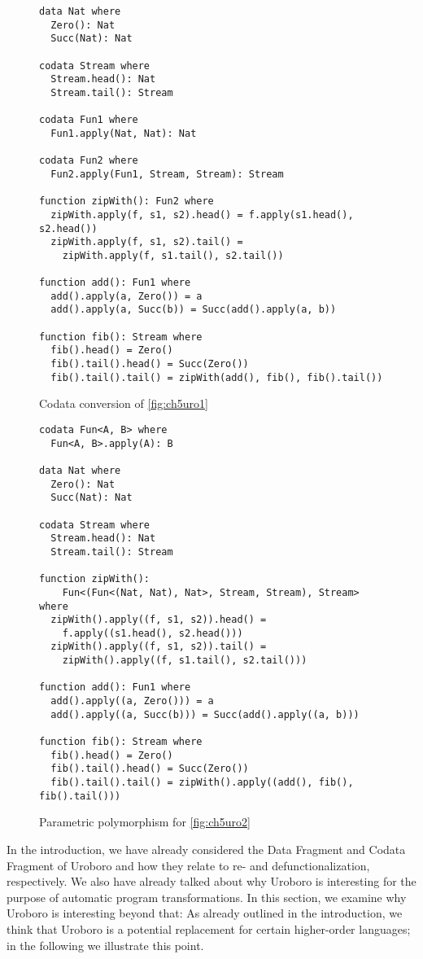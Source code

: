 \begin{figure}
\begin{lstlisting}
data Nat where
  Zero(): Nat
  Succ(Nat): Nat

codata Stream where
  Stream.head(): Nat
  Stream.tail(): Stream

codata Fun1 where
  Fun1.apply(Nat, Nat): Nat

codata Fun2 where
  Fun2.apply(Fun1, Stream, Stream): Stream

function zipWith(): Fun2 where
  zipWith.apply(f, s1, s2).head() = f.apply(s1.head(), s2.head())
  zipWith.apply(f, s1, s2).tail() =
    zipWith.apply(f, s1.tail(), s2.tail())

function add(): Fun1 where
  add().apply(a, Zero()) = a
  add().apply(a, Succ(b)) = Succ(add().apply(a, b))

function fib(): Stream where
  fib().head() = Zero()
  fib().tail().head() = Succ(Zero())
  fib().tail().tail() = zipWith(add(), fib(), fib().tail())
\end{lstlisting}
\caption{Codata conversion of \autoref{fig:ch5uro1}}
\label{fig:ch5uro2}
\end{figure}

\begin{figure}
\begin{lstlisting}
codata Fun<A, B> where
  Fun<A, B>.apply(A): B

data Nat where
  Zero(): Nat
  Succ(Nat): Nat

codata Stream where
  Stream.head(): Nat
  Stream.tail(): Stream

function zipWith():
    Fun<(Fun<(Nat, Nat), Nat>, Stream, Stream), Stream> where
  zipWith().apply((f, s1, s2)).head() =
    f.apply((s1.head(), s2.head()))
  zipWith().apply((f, s1, s2)).tail() =
    zipWith().apply((f, s1.tail(), s2.tail()))

function add(): Fun1 where
  add().apply((a, Zero())) = a
  add().apply((a, Succ(b))) = Succ(add().apply((a, b)))

function fib(): Stream where
  fib().head() = Zero()
  fib().tail().head() = Succ(Zero())
  fib().tail().tail() = zipWith().apply((add(), fib(), fib().tail()))
\end{lstlisting}
\caption{Parametric polymorphism for \autoref{fig:ch5uro2}}
\label{fig:ch5uro3}
\end{figure}

In the introduction, we have already considered the Data Fragment and Codata Fragment of Uroboro and how they relate to re- and defunctionalization, respectively. We also have already talked about why Uroboro is interesting for the purpose of automatic program transformations. In this section, we examine why Uroboro is interesting beyond that: As already outlined in the introduction, we think that Uroboro is a potential replacement for certain higher-order languages; in the following we illustrate this point.

